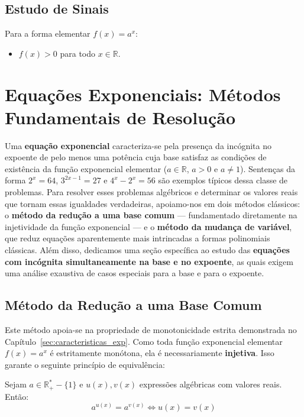 \documentclass[12pt,a4paper]{report}
\begin{document}
	\section{Estudo de Sinais}
	\begin{destaque}
		Para a forma elementar $f(x) = a^x$:
		\begin{itemize}
			\item $f(x) > 0$ para todo $x \in \mathbb{R}$.
		\end{itemize}
	\end{destaque}
	
	\chapter{Equações Exponenciais: Métodos Fundamentais de Resolução}
	\label{sec:equacoes_exp}
	
	Uma \textbf{equação exponencial} caracteriza-se pela presença da incógnita no expoente de pelo menos uma potência cuja base satisfaz as condições de existência da função exponencial elementar ($a \in \mathbb{R}$, $a > 0$ e $a \neq 1$). Sentenças da forma $2^x = 64$, $3^{2x-1} = 27$ e $4^x - 2^x = 56$ são exemplos típicos dessa classe de problemas. Para resolver esses problemas algébricos e determinar os valores reais que tornam essas igualdades verdadeiras, apoiamo-nos em dois métodos clássicos: o \textbf{método da redução a uma base comum} — fundamentado diretamente na injetividade da função exponencial — e o \textbf{método da mudança de variável}, que reduz equações aparentemente mais intrincadas a formas polinomiais clássicas. Além disso, dedicamos uma seção específica ao estudo das \textbf{equações com incógnita simultaneamente na base e no expoente}, as quais exigem uma análise exaustiva de casos especiais para a base e para o expoente.
	
	\section{Método da Redução a uma Base Comum}
	\label{subsec:metodo_base_comum}
	
	Este método apoia-se na propriedade de monotonicidade estrita demonstrada no Capítulo~\ref{sec:caracteristicas_exp}. Como toda função exponencial elementar $f(x) = a^x$ é estritamente monótona, ela é necessariamente \textbf{injetiva}. Isso garante o seguinte princípio de equivalência:
	
	\begin{destaque}
		Sejam $a \in \mathbb{R}^*_+ - \{1\}$ e $u(x), v(x)$ expressões algébricas com valores reais. Então:
		\[
		a^{u(x)} = a^{v(x)} \iff u(x) = v(x)
		\]
	\end{destaque}
	
\end{document}
